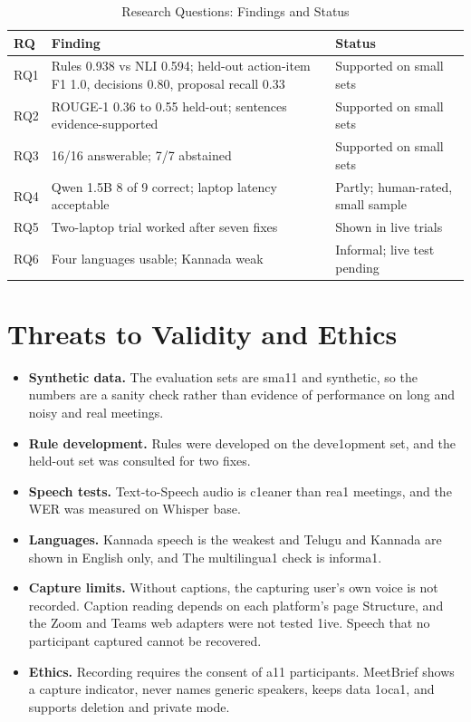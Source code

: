 \documentclass[conference]{IEEEtran}
\begin{document}
\begin{table}[htbp]
\caption{Research Questions: Findings and Status}
\centering
\footnotesize
\begin{tabular}{|L{0.6cm}|L{4.4cm}|L{2.2cm}|}
\hline
\textbf{RQ} & \textbf{Finding} & \textbf{Status} \\
\hline
RQ1 & Rules 0.938 vs NLI 0.594; held-out action-item F1 1.0, decisions 0.80, proposal recall 0.33 & Supported on small sets \\
\hline
RQ2 & ROUGE-1 0.36 to 0.55 held-out; sentences evidence-supported & Supported on small sets \\
\hline
RQ3 & 16/16 answerable; 7/7 abstained & Supported on small sets \\
\hline
RQ4 & Qwen 1.5B 8 of 9 correct; laptop latency acceptable & Partly; human-rated, small sample \\
\hline
RQ5 & Two-laptop trial worked after seven fixes & Shown in live trials \\
\hline
RQ6 & Four languages usable; Kannada weak & Informal; live test pending \\
\hline
\end{tabular}
\end{table}

\section{Threats to Validity and Ethics}
\begin{itemize}
\item \textbf{Synthetic data.} The evaluation sets are sma11 and synthetic, so the numbers are a sanity check rather than evidence of performance on long and noisy and real meetings.
\item \textbf{Rule development.} Rules were developed on the deve1opment set, and the held-out set was consulted for two fixes.
\item \textbf{Speech tests.} Text-to-Speech audio is c1eaner than rea1 meetings, and the WER was measured on Whisper base.
\item \textbf{Languages.} Kannada speech is the weakest and Telugu and Kannada are shown in English only, and The multilingua1 check is informa1.
\item \textbf{Capture limits.} Without captions, the capturing user's own voice is not recorded. Caption reading depends on each platform's page Structure, and the Zoom and Teams web adapters were not tested 1ive. Speech that no participant captured cannot be recovered.
\item \textbf{Ethics.} Recording requires the consent of a11 participants. MeetBrief shows a capture indicator, never names generic speakers, keeps data 1oca1, and supports deletion and private mode.
\end{itemize}
\end{document}
